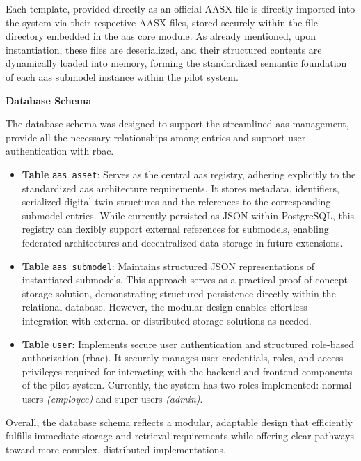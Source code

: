 Each template, provided directly as an official AASX file is directly imported into the system via their respective AASX files, stored securely within the file directory embedded in the \ac{aas} core module. As already mentioned, upon instantiation, these files are deserialized, and their structured contents are dynamically loaded into memory, forming the standardized semantic foundation of each \ac{aas} submodel instance within the pilot system.

\textbf{Database Schema}

The database schema was designed to support the streamlined \ac{aas} management, provide all the necessary relationships among entries and support user authentication with \ac{rbac}.

\begin{itemize}[itemsep=0.5\baselineskip]
    \item \textbf{Table} \verb|aas_asset|: Serves as the central \ac{aas} registry, adhering explicitly to the standardized \ac{aas} architecture requirements. It stores metadata, identifiers, serialized digital twin structures and the references to the corresponding submodel entries. While currently persisted as JSON within PostgreSQL, this registry can flexibly support external references for submodels, enabling federated architectures and decentralized data storage in future extensions.

    \item \textbf{Table} \verb|aas_submodel|: Maintains structured JSON representations of instantiated submodels. This approach serves as a practical proof-of-concept storage solution, demonstrating structured persistence directly within the relational database. However, the modular design enables effortless integration with external or distributed storage solutions as needed.

    \item \textbf{Table} \verb|user|: Implements secure user authentication and structured role-based authorization (\ac{rbac}). It securely manages user credentials, roles, and access privileges required for interacting with the backend and frontend components of the pilot system. Currently, the system has two roles implemented: normal users \textit{(employee)} and super users \textit{(admin)}.
\end{itemize}

Overall, the database schema reflects a modular, adaptable design that efficiently fulfills immediate storage and retrieval requirements while offering clear pathways toward more complex, distributed implementations.

